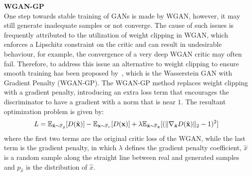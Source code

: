 %
%
\textbf{WGAN-GP}\\
One step towards stable training of GANs is made by WGAN, however, it may still generate inadequate samples or not converge. The cause of such issues is frequently attributed to the utilization of weight clipping in WGAN, which enforces a Lipschitz constraint on the critic and can result in undesirable behaviour, for example, the convergence of a very deep WGAN critic may often fail. Therefore, to address this issue an alternative to weight clipping to ensure smooth training has been proposed by~\cite{wgan-gp}, which is the Wasserstein GAN with Gradient Penalty (WGAN-GP).
The WGAN-GP method replaces weight clipping with a gradient penalty, introducing an extra loss term that encourages the discriminator to have a gradient with a norm that is near $1$. The resultant optimization problem is given by: 
\begin{equation}
    L = \mathbb{E}_{\Tilde{\mathbf{x}}\sim \mathbb{P}_g}[D(\Tilde{\mathbf{x}})] - \mathbb{E}_{\mathbf{x}\sim \mathbb{P}_r}[D(\mathbf{x})] + \lambda \mathbb{E}_{\hat{\mathbf{x}}\sim \mathbb{P}_{\hat{\mathbf{x}}}} [( \| \nabla_{\hat{\mathbf{x}}} D( \hat{\mathbf{x}}) \|_2 - 1)^2]
\end{equation}
where the first two terms are the original critic loss of the WGAN, while the last term is the gradient penalty, in which $\lambda$ defines the gradient penalty coefficient, $\hat{x}$ is a random sample along the straight line between real and generated samples and $p_{\hat{x}}$ is the distribution of $\hat{x}$.
